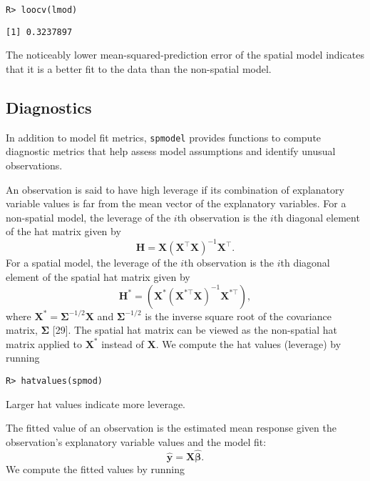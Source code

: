 \documentclass[10pt,letterpaper]{article}
\begin{document}
\begin{verbatim}
R> loocv(lmod)
\end{verbatim}

\begin{verbatim}
[1] 0.3237897
\end{verbatim}

The noticeably lower mean-squared-prediction error of the spatial model
indicates that it is a better fit to the data than the non-spatial
model.

\hypertarget{diagnostics}{%
\subsection{Diagnostics}\label{diagnostics}}

In addition to model fit metrics, \texttt{spmodel} provides functions to
compute diagnostic metrics that help assess model assumptions and
identify unusual observations.

An observation is said to have high leverage if its combination of
explanatory variable values is far from the mean vector of the
explanatory variables. For a non-spatial model, the leverage of the
\(i\)th observation is the \(i\)th diagonal element of the hat matrix
given by \begin{equation*}
  \mathbf{H} = \mathbf{X}(\mathbf{X}^\top\mathbf{X})^{-1}\mathbf{X}^\top .
\end{equation*} For a spatial model, the leverage of the \(i\)th
observation is the \(i\)th diagonal element of the spatial hat matrix
given by \begin{equation*}
  \mathbf{H}^* = (\mathbf{X}^* (\mathbf{X}^{* \top} \mathbf{X})^{-1} \mathbf{X}^{* \top}) ,
\end{equation*} where
\(\mathbf{X}^* = \boldsymbol{\Sigma}^{-1/2}\mathbf{X}\) and
\(\boldsymbol{\Sigma}^{-1/2}\) is the inverse square root of the
covariance matrix, \(\boldsymbol{\Sigma}\) {[}29{]}. The spatial hat
matrix can be viewed as the non-spatial hat matrix applied to
\(\mathbf{X}^*\) instead of \(\mathbf{X}\). We compute the hat values
(leverage) by running

\begin{verbatim}
R> hatvalues(spmod)
\end{verbatim}

Larger hat values indicate more leverage.

The fitted value of an observation is the estimated mean response given
the observation's explanatory variable values and the model fit:
\begin{equation*}
  \hat{\mathbf{y}} = \mathbf{X} \hat{\boldsymbol{\beta}}.
\end{equation*} We compute the fitted values by running
\end{document}
